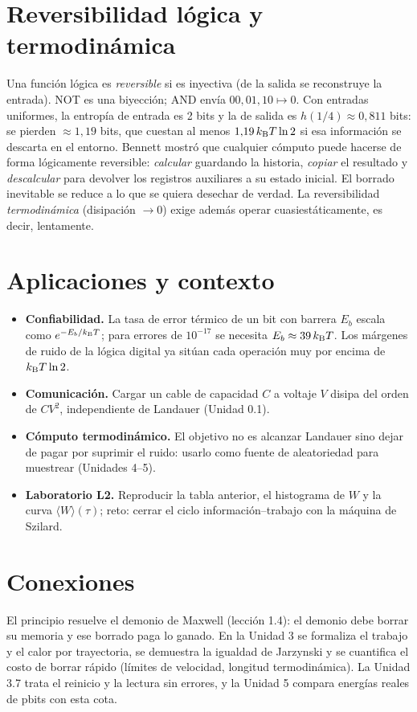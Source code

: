 \documentclass[11pt,a4paper]{article}
\begin{document}
\section{Reversibilidad lógica y termodinámica}
Una función lógica es \emph{reversible} si es inyectiva (de la salida se reconstruye la entrada).
NOT es una biyección; AND envía $00,01,10\mapsto0$. Con entradas uniformes, la entropía de entrada es
2 bits y la de salida es $h(1/4)\approx0{,}811$ bits: se pierden $\approx1{,}19$ bits, que cuestan al
menos $1{,}19\,k_{\mathrm B} T\ln2$ si esa información se descarta en el entorno.
Bennett \cite{bennett} mostró que cualquier cómputo puede hacerse de forma lógicamente reversible:
\emph{calcular} guardando la historia, \emph{copiar} el resultado y \emph{descalcular} para devolver los
registros auxiliares a su estado inicial. El borrado inevitable se reduce a lo que se quiera
desechar de verdad. La reversibilidad \emph{termodinámica} (disipación $\to0$) exige además
operar cuasiestáticamente, es decir, lentamente.

\section{Aplicaciones y contexto}
\begin{aplicacion}
\begin{itemize}[nosep]
\item \textbf{Confiabilidad.} La tasa de error térmico de un bit con barrera $E_b$ escala como
$e^{-E_b/k_{\mathrm B} T}$; para errores de $10^{-17}$ se necesita $E_b\approx 39\,k_{\mathrm B} T$. Los márgenes de ruido de
la lógica digital ya sitúan cada operación muy por encima de $k_{\mathrm B} T\ln2$.
\item \textbf{Comunicación.} Cargar un cable de capacidad $C$ a voltaje $V$ disipa del orden de $CV^2$,
independiente de Landauer (Unidad 0.1).
\item \textbf{Cómputo termodinámico.} El objetivo no es alcanzar Landauer sino dejar de pagar por
suprimir el ruido: usarlo como fuente de aleatoriedad para muestrear (Unidades 4--5).
\item \textbf{Laboratorio L2.} Reproducir la tabla anterior, el histograma de $W$ y la curva
$\langle W\rangle(\tau)$; reto: cerrar el ciclo información--trabajo con la máquina de Szilard.
\end{itemize}
\end{aplicacion}

\section{Conexiones}
El principio resuelve el demonio de Maxwell (lección 1.4): el demonio debe borrar su memoria y ese
borrado paga lo ganado. En la Unidad 3 se formaliza el trabajo y el calor por trayectoria, se
demuestra la igualdad de Jarzynski y se cuantifica el costo de borrar rápido (límites de velocidad,
longitud termodinámica). La Unidad 3.7 trata el reinicio y la lectura sin errores, y la Unidad 5
compara energías reales de pbits con esta cota.
\end{document}
